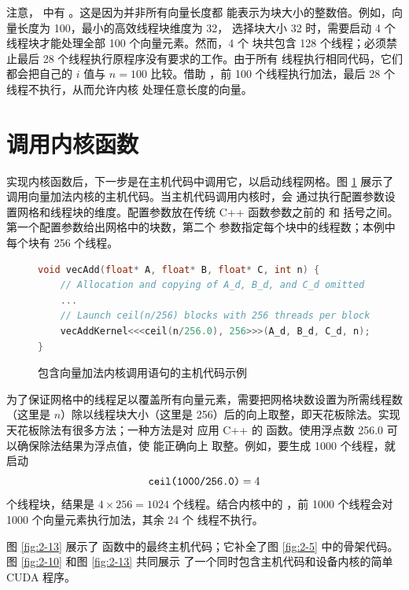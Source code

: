 注意， 中有 。这是因为并非所有向量长度都
能表示为块大小的整数倍。例如，向量长度为 100，最小的高效线程块维度为 32，
选择块大小 32 时，需要启动 4 个线程块才能处理全部 100 个向量元素。然而，4 个
块共包含 128 个线程；必须禁止最后 28 个线程执行原程序没有要求的工作。由于所有
线程执行相同代码，它们都会把自己的 $i$ 值与 $n=100$ 比较。借助
，前 100 个线程执行加法，最后 28 个线程不执行，从而允许内核
处理任意长度的向量。

\section{调用内核函数}
\label{sec:calling-kernel-functions}

实现内核函数后，下一步是在主机代码中调用它，以启动线程网格。图
\ref{fig:2-12} 展示了调用向量加法内核的主机代码。当主机代码调用内核时，会
通过执行配置参数设置网格和线程块的维度。配置参数放在传统 C++ 函数参数之前的
\code{<<<} 和 \code{>>>} 括号之间。第一个配置参数给出网格中的块数，第二个
参数指定每个块中的线程数；本例中每个块有 256 个线程。

\begin{figure}[htbp]
  \centering
  \begin{lstlisting}[language=C++]
void vecAdd(float* A, float* B, float* C, int n) {
    // Allocation and copying of A_d, B_d, and C_d omitted
    ...
    // Launch ceil(n/256) blocks with 256 threads per block
    vecAddKernel<<<ceil(n/256.0), 256>>>(A_d, B_d, C_d, n);
}
  \end{lstlisting}
  \caption{包含向量加法内核调用语句的主机代码示例}
  \label{fig:2-12}
\end{figure}


为了保证网格中的线程足以覆盖所有向量元素，需要把网格块数设置为所需线程数
（这里是 $n$）除以线程块大小（这里是 256）后的向上取整，即天花板除法。实现
天花板除法有很多方法；一种方法是对  应用 C++ 的 
函数。使用浮点数 256.0 可以确保除法结果为浮点值，使  能正确向上
取整。例如，要生成 1000 个线程，就启动
\[
  \code{ceil(1000/256.0)}=4
\]
个线程块，结果是 $4\times256=1024$ 个线程。结合内核中的
，前 1000 个线程会对 1000 个向量元素执行加法，其余 24 个
线程不执行。

图 \ref{fig:2-13} 展示了  函数中的最终主机代码；它补全了图
\ref{fig:2-5} 中的骨架代码。图 \ref{fig:2-10} 和图 \ref{fig:2-13} 共同展示
了一个同时包含主机代码和设备内核的简单 CUDA 程序。


